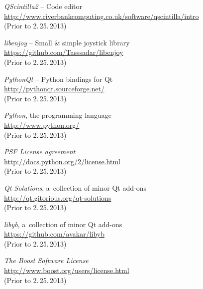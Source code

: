 \documentclass[12pt, a4paper, oneside]{article}
\newcommand{\It}{\textit}  %
\begin{document}
\begin{thebibliography}{99}
     \It{QScintilla2} -- Code editor \\
    \url{http://www.riverbankcomputing.co.uk/software/qscintilla/intro}\\
    (Prior to 2.\,25.\,2013)

     \It{libenjoy} -- Small & simple joystick library \\
    \url{https://github.com/Tasssadar/libenjoy}\\
    (Prior to 2.\,25.\,2013)

     \It{PythonQt} -- Python bindings for Qt \\
    \url{http://pythonqt.sourceforge.net/}\\
    (Prior to 2.\,25.\,2013)

     \It{Python}, the programming language \\
    \url{http://www.python.org/}\\
    (Prior to 2.\,25.\,2013)

     \It{PSF License agreement} \\
    \url{http://docs.python.org/2/license.html}\\
    (Prior to 2.\,25.\,2013)

     \It{Qt Solutions}, a~collection of minor Qt add-ons\\
    \url{http://qt.gitorious.org/qt-solutions}\\
    (Prior to 2.\,25.\,2013)

     \It{libyb}, a~collection of minor Qt add-ons\\
    \url{https://github.com/avakar/libyb}\\
    (Prior to 2.\,25.\,2013)

     \It{The Boost Software License} \\
    \url{http://www.boost.org/users/license.html}\\
    (Prior to 2.\,25.\,2013)

\end{thebibliography}
\end{document}
